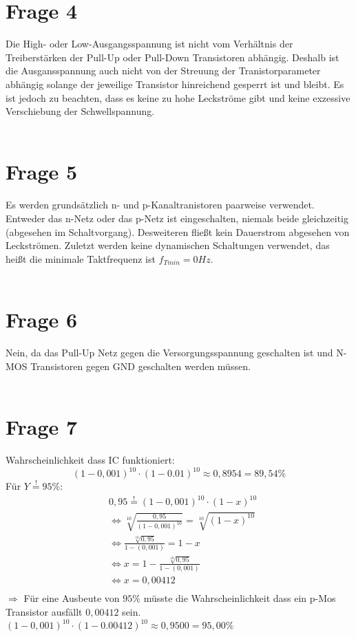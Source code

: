 \documentclass[a4paper]{scrartcl}
\begin{document}
\section*{Frage 4}
Die High- oder Low-Ausgangsspannung ist nicht vom Verhältnis der Treiberstärken der Pull-Up oder Pull-Down Transistoren abhängig. Deshalb ist die Ausgansspannung auch nicht von der Streuung der Tranistorparameter abhängig solange der jeweilige Transistor hinreichend gesperrt ist und bleibt. Es ist jedoch zu beachten, dass es keine zu hohe Leckströme gibt und keine exzessive Verschiebung der Schwellspannung.
~\\
~\\
\section*{Frage 5}
Es werden grundsätzlich n- und p-Kanaltranistoren paarweise verwendet. Entweder das n-Netz oder das p-Netz ist eingeschalten, niemals beide gleichzeitig (abgesehen im Schaltvorgang). Desweiteren fließt kein Dauerstrom abgesehen von Leckströmen. Zuletzt werden keine dynamischen Schaltungen verwendet, das heißt die minimale Taktfrequenz ist $f_{Tmin} = 0 Hz$.
~\\
~\\
\section*{Frage 6}
Nein, da das Pull-Up Netz gegen die Versorgungsspannung geschalten ist und N-MOS Transistoren gegen GND geschalten werden müssen.
~\\
~\\
\section*{Frage 7}
Wahrscheinlichkeit dass IC funktioniert:
$$(1-0,001)^{10} \cdot (1-0.01)^{10} \approx 0,8954 = 89,54 \% $$
Für $Y \overset{!}{=} 95 \%$:
\begin{align*}
	&0,95 \overset{!}{=} (1-0,001)^{10} \cdot (1-x)^{10}\\
	&\Leftrightarrow \sqrt[10]{\frac{0,95}{(1-0,001)^{10}}} = \sqrt[10]{(1-x)^{10}}\\
	&\Leftrightarrow \frac{\sqrt[10]{0,95}}{1-(0,001)} = 1 -x\\
	&\Leftrightarrow x = 1 - \frac{\sqrt[10]{0,95}}{1-(0,001)}\\
	& \Leftrightarrow x = 0,00412\\
\end{align*}
$\Rightarrow$ Für eine Ausbeute von $95 \%$ müsste die Wahrscheinlichkeit dass ein p-Mos Transistor ausfällt $0,00412$ sein.\\
$(1-0,001)^{10} \cdot (1-0.00412)^{10} \approx 0,9500 = 95,00 \% $
~\\
~\\
\end{document}

